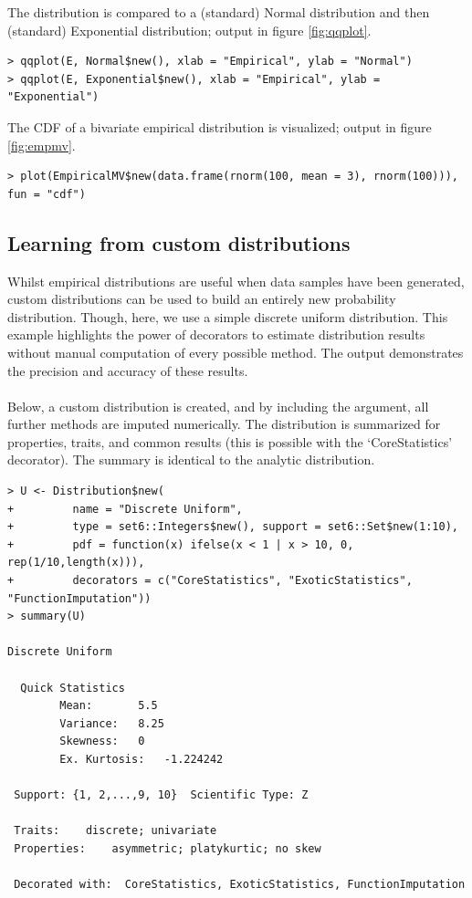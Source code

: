 The distribution is compared to a (standard) Normal distribution and then (standard) Exponential distribution; output in figure \ref{fig:qqplot}.

\begin{verbatim}
> qqplot(E, Normal$new(), xlab = "Empirical", ylab = "Normal")
> qqplot(E, Exponential$new(), xlab = "Empirical", ylab = "Exponential")
\end{verbatim}

The CDF of a bivariate empirical distribution is visualized; output in figure \ref{fig:empmv}.

\begin{verbatim}
> plot(EmpiricalMV$new(data.frame(rnorm(100, mean = 3), rnorm(100))), fun = "cdf")
\end{verbatim}

\subsection{Learning from custom distributions}

Whilst empirical distributions are useful when data samples have been generated, custom distributions can be used to build an entirely new probability distribution. Though, here, we use a simple discrete uniform distribution. This example highlights the power of decorators to estimate distribution results without manual computation of every possible method. The output demonstrates the precision and accuracy of these results.
\\\\
Below, a custom distribution is created, and by including the  argument, all further methods are imputed numerically.  The distribution is summarized for properties, traits, and common results (this is possible with the `CoreStatistics' decorator). The summary is identical to the analytic  distribution.

\begin{verbatim}
> U <- Distribution$new(
+         name = "Discrete Uniform",
+         type = set6::Integers$new(), support = set6::Set$new(1:10),
+         pdf = function(x) ifelse(x < 1 | x > 10, 0, rep(1/10,length(x))),
+         decorators = c("CoreStatistics", "ExoticStatistics", "FunctionImputation"))
> summary(U)

Discrete Uniform

  Quick Statistics
	    Mean:		5.5
	    Variance:	8.25
	    Skewness:	0
	    Ex. Kurtosis:	-1.224242

 Support: {1, 2,...,9, 10} 	Scientific Type: Z

 Traits:	discrete; univariate
 Properties:	asymmetric; platykurtic; no skew

 Decorated with:  CoreStatistics, ExoticStatistics, FunctionImputation
\end{verbatim}

